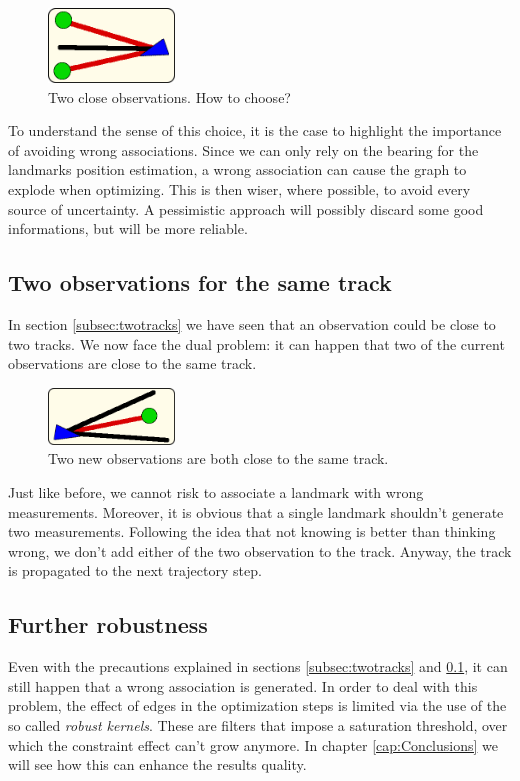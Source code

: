 \begin{figure}[htbp]
  \centering
    \includegraphics[width=0.3\textwidth]{images/uncertainty1.png}
  \caption{Two close observations. How to choose?}
  \label{fig:uncertainty1}
\end{figure}

To understand the sense of this choice, it is the case to highlight the importance of avoiding wrong associations.
Since we can only rely on the bearing for the landmarks position estimation, a wrong association can cause the graph to explode when optimizing.
This is then wiser, where possible, to avoid every source of uncertainty.
A pessimistic approach will possibly discard some good informations, but will be more reliable.

\subsection{Two observations for the same track}\label{subsec:twoobservations}
In section \ref{subsec:twotracks} we have seen that an observation could be close to two tracks.
We now face the dual problem: it can happen that two of the current observations are close to the same track.

\begin{figure}[htbp]
  \centering
    \includegraphics[width=0.3\textwidth]{images/uncertainty2.png}
  \caption{Two new observations are both close to the same track.}
  \label{fig:uncertainty2}
\end{figure}

Just like before, we cannot risk to associate a landmark with wrong measurements.
Moreover, it is obvious that a single landmark shouldn't generate two measurements.
Following the idea that not knowing is better than thinking wrong, we don't add either of the two observation to the track.
Anyway, the track is propagated to the next trajectory step.

\subsection{Further robustness}
Even with the precautions explained in sections \ref{subsec:twotracks} and \ref{subsec:twoobservations}, it can still happen that a wrong association is generated. In order to deal with this problem, the effect of edges in the optimization steps is limited via the use of the so called \textit{robust kernels}.
These are filters that impose a saturation threshold, over which the constraint effect can't grow anymore.
In chapter \ref{cap:Conclusions} we will see how this can enhance the results quality.

